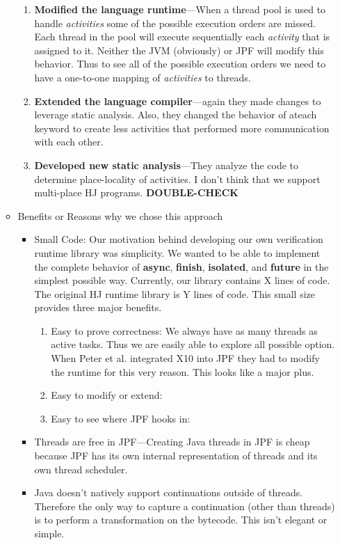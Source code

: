 \begin{itemize}
\begin{itemize}
\begin{enumerate}
			\item \textbf{Modified the language runtime}---When a thread pool is used to handle \textit{activities} some of the possible execution orders are missed. Each thread in the pool will execute sequentially each \textit{activity} that is assigned to it. Neither the JVM (obviously) or JPF will modify this behavior. Thus to see all of the possible execution orders we need to have a one-to-one mapping of \textit{activities} to threads. 

			\item \textbf{Extended the language compiler}---again they made changes to leverage static analysis. Also, they changed the behavior of ateach keyword to create less activities that performed more communication with each other.

			\item \textbf{Developed new static analysis}---They analyze the code to determine place-locality of activities. I don't think that we support multi-place HJ programs. \textbf{DOUBLE-CHECK}
		\end{enumerate}
	\item Benefits or Reasons why we chose this approach
		\begin{itemize}
		\item Small Code: Our motivation behind developing our own verification runtime library was simplicity. We wanted to be able to implement the complete behavior of \textbf{async}, \textbf{finish}, \textbf{isolated}, and \textbf{future} in the simplest possible way. Currently, our library contains X lines of code. The original HJ runtime library is Y lines of code. This small size provides three major benefits.
			\begin{enumerate}
			\item Easy to prove correctness: We always have as many threads as active tasks. Thus we are easily able to explore all possible option. When Peter et al. integrated X10 into JPF they had to modify the runtime for this very reason. This looks like a major plus. 
			\item Easy to modify or extend:  
			\item Easy to see where JPF hooks in:
			\end{enumerate}
		\item Threads are free in JPF---Creating Java threads in JPF is cheap because JPF has its own internal representation of threads and its own thread scheduler. 
		\item Java doesn't natively support continuations outside of threads. Therefore the only way to capture a continuation (other than threads) is to perform a transformation on the bytecode. This isn't elegant or simple.
		\end{itemize}
	\end{itemize}
\end{itemize}
